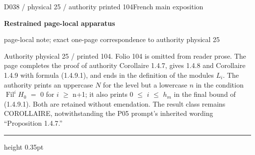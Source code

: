 \documentclass[9pt]{article}
\newcommand{\CanonText}[1]{\par{\fontsize{8.0}{9.35}\selectfont\RaggedRight #1\par}\vspace{2.2pt}}
\newcommand{\LayerTitle}{Restrained page-local apparatus}
\begin{document}
\noindent\begin{minipage}[t][\dimexpr\textheight-5pt\relax][t]{\textwidth}
{\sffamily\fontsize{7.3}{8.2}\selectfont\color{Quiet} D038 / physical 25 / authority printed 104\hfill French main exposition}
\par{}\vspace{4.5pt}
{\sffamily\fontsize{10.4}{11.6}\selectfont\bfseries\color{Accent} \LayerTitle}
\par{\sffamily\fontsize{6.7}{7.7}\selectfont\color{Quiet} page-local note; exact one-page correspondence to authority physical 25}
\vspace{5pt}
\CanonText{Authority physical 25 / printed 104. Folio 104 is omitted from reader prose. The page completes the proof of authority Corollaire 1.4.7, gives 1.4.8 and Corollaire 1.4.9 with formula (1.4.9.1), and ends in the definition of the modules \(L_{i}\). The authority prints an uppercase \(N\) for the level but a lowercase \(n\) in the condition \(\operatorname{Fil}^{i}H_{0}\) \(=\) 0 for \(i\) \(\geq{}\) n+1; it also prints 0 \(\leq{}\) \(i\) \(\leq{}\) \(h_{m}\) in the final bound of (1.4.9.1). Both are retained without emendation. The result class remains COROLLAIRE, notwithstanding the P05 prompt's inherited wording “Proposition 1.4.7.”}
\vfill
{\color{Accent}\hrule height 0.35pt}\vspace{3pt}
\end{minipage}
\newpage
\end{document}
